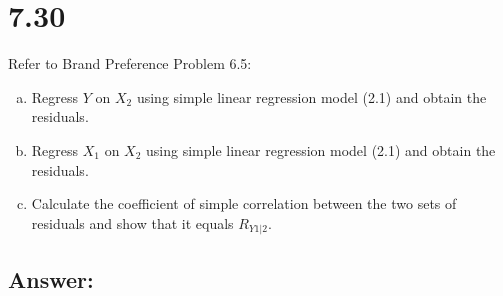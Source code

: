 \documentclass{article}
\begin{document}
\section{7.30}

Refer to Brand Preference Problem 6.5:

\begin{enumerate}[a)]
\item{} Regress $Y$ on $X_2$ using simple linear regression model (2.1) and obtain the residuals.
\item{} Regress $X_1$ on $X_2$ using simple linear regression model (2.1) and obtain the residuals.
\item{} Calculate the coefficient of simple correlation between the two sets of residuals and show that it equals $R_{Y1|2}$.
\end{enumerate}

\subsection{Answer:}
\end{document}

